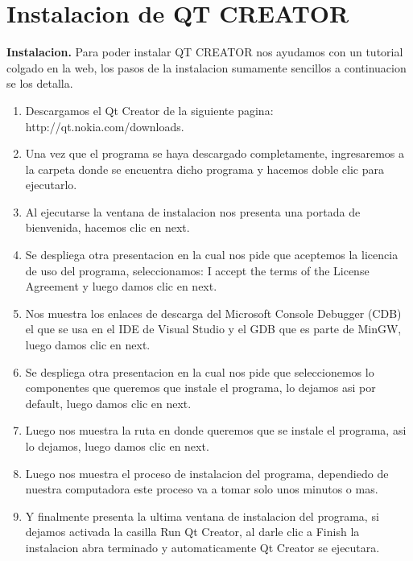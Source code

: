 \documentclass{article}
\begin{document}
\section{Instalacion de QT CREATOR}
{\bf Instalacion.} Para poder instalar QT CREATOR nos ayudamos con un tutorial colgado en la web, los pasos de la instalacion sumamente sencillos a continuacion se los detalla.
\begin{enumerate}
\item{\bf} Descargamos el Qt Creator de la siguiente pagina: http://qt.nokia.com/downloads.
\item{\bf} Una vez que el programa se haya descargado completamente, ingresaremos a la carpeta donde se encuentra dicho programa y hacemos doble clic para ejecutarlo.
\item{\bf} Al ejecutarse la ventana de instalacion nos presenta una portada de bienvenida, hacemos clic en next.
\item{\bf} Se despliega otra presentacion en la cual nos pide que aceptemos la licencia de uso del programa, seleccionamos: I accept the terms of the License Agreement y luego damos clic en next.
\item{\bf} Nos muestra los enlaces de descarga del Microsoft Console Debugger (CDB) el que se usa en el IDE de Visual Studio y el GDB que es parte de MinGW, luego damos clic en next.
\item{\bf} Se despliega otra presentacion en la cual nos pide que seleccionemos lo componentes que queremos que instale el programa, lo dejamos asi por default, luego damos clic en next.
\item{\bf} Luego nos muestra la ruta en donde queremos que se instale el programa, asi lo dejamos, luego damos clic en next.
\item{\bf} Luego nos muestra el proceso de instalacion del programa, dependiedo de nuestra computadora este proceso va a tomar solo unos minutos o mas.
\item{\bf} Y finalmente presenta la ultima ventana de instalacion del programa, si dejamos activada la casilla Run Qt Creator, al darle clic a Finish la instalacion abra terminado y automaticamente Qt Creator se ejecutara.

\end{enumerate}
\end{document}
